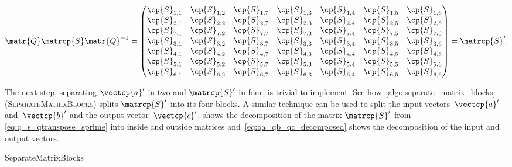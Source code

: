 \begin{equation}
    \matr{Q} \matrcp{S} \matr{Q}^{-1}
    =
    \begin{pmatrix}
        \cp{S}_{1,1} & \cp{S}_{1,2} & \cp{S}_{1,7} & \cp{S}_{1,3} & \cp{S}_{1,4} & \cp{S}_{1,5} & \cp{S}_{1,6} \\
        \cp{S}_{2,1} & \cp{S}_{2,2} & \cp{S}_{2,7} & \cp{S}_{2,3} & \cp{S}_{2,4} & \cp{S}_{2,5} & \cp{S}_{2,6} \\
        \cp{S}_{7,1} & \cp{S}_{7,2} & \cp{S}_{7,7} & \cp{S}_{7,3} & \cp{S}_{7,4} & \cp{S}_{7,5} & \cp{S}_{7,6} \\
        \cp{S}_{3,1} & \cp{S}_{3,2} & \cp{S}_{3,7} & \cp{S}_{3,3} & \cp{S}_{3,4} & \cp{S}_{3,5} & \cp{S}_{3,6} \\
        \cp{S}_{4,1} & \cp{S}_{4,2} & \cp{S}_{4,7} & \cp{S}_{4,3} & \cp{S}_{4,4} & \cp{S}_{4,5} & \cp{S}_{4,6} \\
        \cp{S}_{5,1} & \cp{S}_{5,2} & \cp{S}_{5,7} & \cp{S}_{5,3} & \cp{S}_{5,4} & \cp{S}_{5,5} & \cp{S}_{5,6} \\
        \cp{S}_{6,1} & \cp{S}_{6,2} & \cp{S}_{6,7} & \cp{S}_{6,3} & \cp{S}_{6,4} & \cp{S}_{6,5} & \cp{S}_{6,6} \\
    \end{pmatrix}
    =
    \matrcp{S}'
    \text{.}
    \label{eq:q_s_qtranspose_sprime}
\end{equation}

The next step, separating $\vectcp{a}'$ in two and $\matrcp{S}'$ in four, is trivial to implement.
See how~\cref{algo:separate_matrix_blocks}
(\textsc{SeparateMatrixBlocks}) splits $\matrcp{S}'$ into its four blocks.
A similar technique can be used to split
the input vectors~$\vectcp{a}'$ and~$\vectcp{b}'$ and
the output vector~$\vectcp{c}'$.
 shows the decomposition
of the matrix $\matrcp{S}'$ from \cref{eq:q_s_qtranspose_sprime}
into inside and outside matrices
and~\cref{eq:qa_qb_qc_decomposed} shows the decomposition of
the input and output vectors.

\begin{algorithm}[hbtp]
    \caption{SeparateMatrixBlocks}
    \label{algo:separate_matrix_blocks}
    \begin{algorithmic}
         
         
        \\ 
        \EndFunction
    \end{algorithmic}
\end{algorithm}

